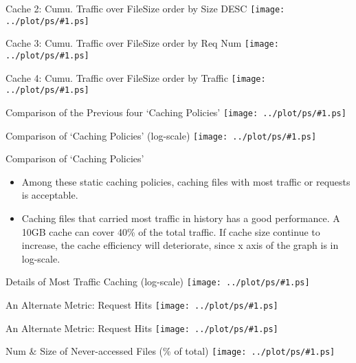 \documentclass{beamer}
\newcommand\graph[1]{{\texttt{[image: ../plot/ps/\#1.ps]}}}
\begin{document}
\begin{frame}{Cache 2: Cumu. Traffic over FileSize order by Size DESC}
\graph{file-traffic-size-desc-acc}
\end{frame}

\begin{frame}{Cache 3: Cumu. Traffic over FileSize order by Req Num}
\graph{file-traffic-req-acc}
\end{frame}

\begin{frame}{Cache 4: Cumu. Traffic over FileSize order by Traffic}
\graph{file-traffic-traffic-acc}
\end{frame}

\begin{frame}{Comparison of the Previous four `Caching Policies'}
\graph{file-traffic-four-acc}
\end{frame}

\begin{frame}{Comparison of `Caching Policies' (log-scale)}
\graph{file-traffic-four-acc-log}
\end{frame}

\begin{frame}{Comparison of `Caching Policies'}
\begin{itemize}
  \item Among these static caching policies, caching files with most traffic or requests is acceptable.
  \item Caching files that carried most traffic in history has a good performance. A 10GB cache can cover 40\% of the total traffic. If cache size continue to increase, the cache efficiency will deteriorate, since x axis of the graph is in log-scale.
\end{itemize}
\end{frame}

\begin{frame}{Details of Most Traffic Caching (log-scale)}
\graph{file-traffic-traffic-filenum}
\end{frame}

\begin{frame}{An Alternate Metric: Request Hits}
\graph{file-req-four-acc}
\end{frame}

\begin{frame}{An Alternate Metric: Request Hits}
\graph{file-req-four-acc-log}
\end{frame}

\begin{frame}{Num \& Size of Never-accessed Files (\% of total)}
\graph{file-dist-never-req}
\end{frame}
\end{document}
